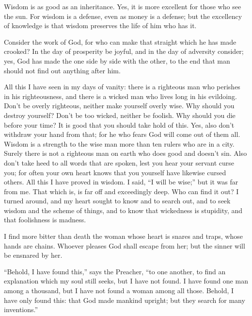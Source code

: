  Wisdom is as good as an inheritance. Yes, it is more
excellent for those who see the sun.  For wisdom is a
defense, even as money is a defense; but the excellency of knowledge is
that wisdom preserves the life of him who has it.

 Consider the work of God, for who can make that straight
which he has made crooked?  In the day of prosperity be
joyful, and in the day of adversity consider; yes, God has made the one
side by side with the other, to the end that man should not find out
anything after him.

 All this I have seen in my days of vanity: there is a
righteous man who perishes in his righteousness, and there is a wicked
man who lives long in his evildoing.  Don't be overly
righteous, neither make yourself overly wise. Why should you destroy
yourself?  Don't be too wicked, neither be foolish. Why
should you die before your time?  It is good that you
should take hold of this. Yes, also don't withdraw your hand from that;
for he who fears God will come out of them all.  Wisdom
is a strength to the wise man more than ten rulers who are in a city.
 Surely there is not a righteous man on earth who does
good and doesn't sin.  Also don't take heed to all words
that are spoken, lest you hear your servant curse you; 
for often your own heart knows that you yourself have likewise cursed
others.  All this I have proved in wisdom. I said, ``I
will be wise;'' but it was far from me.  That which is,
is far off and exceedingly deep. Who can find it out?  I
turned around, and my heart sought to know and to search out, and to
seek wisdom and the scheme of things, and to know that wickedness is
stupidity, and that foolishness is madness.

 I find more bitter than death the woman whose heart is
snares and traps, whose hands are chains. Whoever pleases God shall
escape from her; but the sinner will be ensnared by her.

 ``Behold, I have found this,'' says the Preacher, ``to
one another, to find an explanation  which my soul still
seeks, but I have not found. I have found one man among a thousand, but
I have not found a woman among all those.  Behold, I have
only found this: that God made mankind upright; but they search for many
inventions.''

